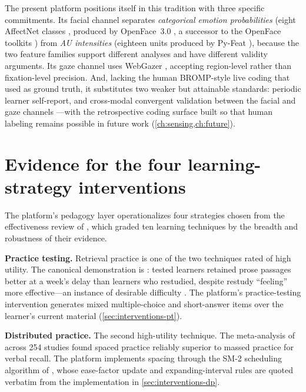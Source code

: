 The present platform positions itself in this tradition with three
specific commitments. Its facial channel separates \emph{categorical
emotion probabilities} (eight AffectNet classes
\citep{mollahosseini2019affectnet}, produced by OpenFace~3.0
\citep{openface3}, a successor to the OpenFace toolkits
\citep{baltrusaitis2018openface}) from \emph{AU intensities} (eighteen
units produced by Py-Feat \citep{cheong2023pyfeat}), because the two
feature families support different analyses and have different validity
arguments. Its gaze channel uses WebGazer
\citep{papoutsaki2016webgazer}, accepting region-level rather than
fixation-level precision. And, lacking the human BROMP-style live coding
that \citet{bosch2015} used as ground truth, it substitutes two weaker but
attainable standards: periodic learner self-report, and cross-modal
convergent validation between the facial and gaze channels
\citep{campbell1959}---with the retrospective coding surface built so
that human labeling remains possible in future work
(\cref{ch:sensing,ch:future}).

\section{Evidence for the four learning-strategy interventions}
\label{sec:bg-strategies}

The platform's pedagogy layer operationalizes four strategies chosen from
the effectiveness review of \citet{dunlosky2013}, which graded ten
learning techniques by the breadth and robustness of their evidence.

\textbf{Practice testing.} Retrieval practice is one of the two techniques
\citet{dunlosky2013} rated of high utility. The canonical demonstration is
\citet{roediger2006}: tested learners retained prose passages better at a
week's delay than learners who restudied, despite restudy ``feeling''
more effective---an instance of desirable difficulty
\citep{bjork1994}. The platform's practice-testing intervention generates
mixed multiple-choice and short-answer items over the learner's current
material (\cref{sec:interventions-pt}).

\textbf{Distributed practice.} The second high-utility technique.
The meta-analysis of \citet{cepeda2006} across 254 studies found spaced
practice reliably superior to massed practice for verbal recall. The
platform implements spacing through the SM-2 scheduling algorithm of
\citet{wozniak1994}, whose ease-factor update and expanding-interval rules
are quoted verbatim from the implementation in
\cref{sec:interventions-dp}.

